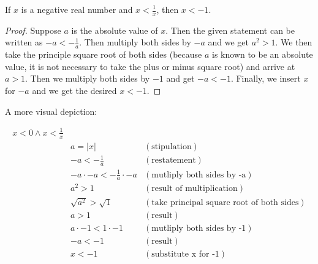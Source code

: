 
\begin{theorem}
  If $x$ is a negative real number and $x < \frac{1}{x}$, then $x < -1$.
\end{theorem}

\begin{proof}
  Suppose $a$ is the absolute value of $x$. Then the given statement can be
  written as $-a < - \frac{1}{a}$. Then multiply both sides by $-a$ and we get
  $a^2 > 1$. We then take the principle square root of both sides (because $a$
  is known to be an absolute value, it is not necessary to take the plus or
  minus square root) and arrive at $a>1$. Then we multiply both sides by $-1$
  and get $-a<-1$. Finally, we insert $x$ for $-a$ and we get the desired $x <
  -1$.
\end{proof}

A more visual depiction:

\begin{align*}
  x < 0 \land x < \frac{1}{x}\\
  &a = |x| &(\textrm{stipulation})\\
  &-a < -\frac{1}{a} &(\textrm{restatement})\\
  &-a \cdot -a < -\frac{1}{a} \cdot -a &(\textrm{mutliply both sides by -a})\\
  &a^2 > 1 &(\textrm{result of multiplication})\\
  &\sqrt{a^2} > \sqrt{1} &(\textrm{take principal square root of both sides})\\
  &a > 1 &(\textrm{result})\\
  &a \cdot -1 < 1 \cdot -1 &(\textrm{mutliply both sides by -1})\\
  &-a < -1 &(\textrm{result})\\
  &x < -1 &(\textrm{substitute x for -1})
\end{align*}

